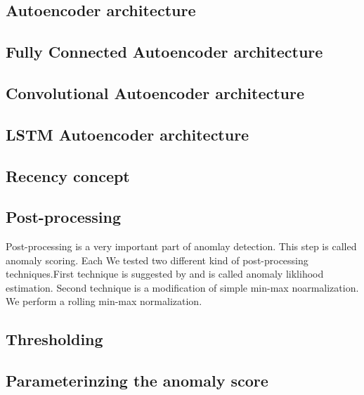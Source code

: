 \documentclass[12pt]{article}
\begin{document}
\subsection{Autoencoder architecture}
\subsection{Fully Connected Autoencoder architecture}
\subsection{Convolutional Autoencoder architecture}
\subsection{LSTM Autoencoder architecture}
\subsection{Recency concept}
\subsection{Post-processing}
Post-processing is a very important part of anomlay detection. This step is called anomaly scoring. Each We tested two different kind of post-processing techniques.First technique is suggested by \cite{ahmad2017unsupervised} and is called anomaly liklihood estimation. Second technique is a modification of simple min-max noarmalization. We perform a rolling min-max normalization. \\
\break

\subsection{Thresholding}

\subsection{Parameterinzing the anomaly score}
\end{document}
